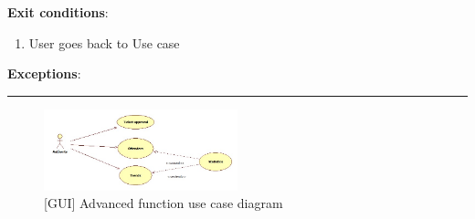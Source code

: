   \textbf{Exit conditions}:
  \begin{enumerate}
    \item{User goes back to Use case }
  \end{enumerate}
  \textbf{Exceptions}:
  \begin{enumerate}
  \end{enumerate}
  \rule{\linewidth}{0.4pt}
 \begin{figure}[H]
		\centering
      \includegraphics[width=0.5\textwidth]{GUI/Advanced FunUseCase.jpg}
      \caption{[GUI] Advanced function use case diagram}   \label{fig:AdvancedFunction}
\end{figure}
  
